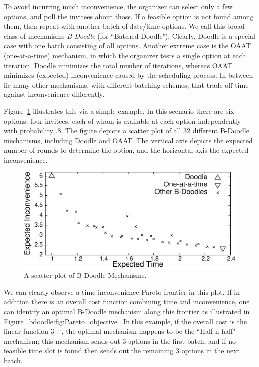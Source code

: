 To avoid incurring much inconvenience, the organizer can select only a few options,
and poll the invitees about those. If a feasible option is not found
among them, then repeat with another batch of date/time options. 
We call this broad class of mechanisms \emph{B-Doodle} (for ``Batched Doodle").
Clearly, Doodle is a special case with one batch consisting of all
options. Another extreme case is the OAAT (one-at-a-time)
mechanism, in which the organizer tests a single option at each
iteration. Doodle minimizes the total number of iterations, whereas 
OAAT minimizes (expected) inconvenience caused by the scheduling process.
In-between lie many other mechanisms, with different
batching schemes, that trade off time against inconvenience
differently.

Figure~\ref{bdoodle:fig:Pareto_scatter} illustrates this via a simple example.
In this scenario there are six options, four invitees, each of whom
is available at each option independently with probability $.8$.
The figure depicts a scatter plot of all 32 different B-Doodle mechanisms,
including Doodle and OAAT. The vertical axis depicts the expected
number of rounds to determine the option, and the horizontal axis
the expected inconvenience.

\begin{figure}[h!] \small
\centering
\includegraphics[scale=0.45]{plots/pareto_scatter_fin.eps}
\caption{A scatter plot of B-Doodle Mechanisms.}
\label{bdoodle:fig:Pareto_scatter}
\end{figure}

We can clearly observe a time-inconvenience Pareto frontier in this
plot. If in addition there is an overall cost function combining time
and inconvenience, one can identify an optimal B-Doodle mechanism
along this frontier as illustrated in
Figure~\ref{bdoodle:fig:Pareto_objective}. In this example, if the overall
cost is the linear function 3$\cdot$\Time+\Inconvenience, the optimal
mechanism happens to be the ``Half-n-half" mechanism; this mechanism
sends out $3$ options in the first batch, and if no feasible time
slot is found then sends out the remaining $3$ options in the next
batch.

